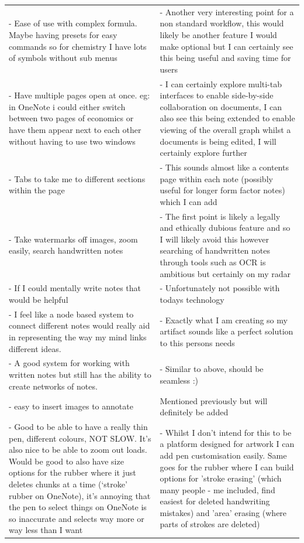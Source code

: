 \begin{longtable}{@{}p{}@{\hspace{1em}}p{}@{}}
 - Ease of use with complex formula. Maybe having presets for easy commands so for chemistry I have lots of symbols without sub menus &
 - Another very interesting point for a non standard workflow, this would likely be another feature I would make optional but I can certainly see this being useful and saving time for users \\

 - Have multiple pages open at once. eg: in OneNote i could either switch between two pages of economics or have them appear next to each other without having to use two windows &
 - I can certainly explore multi-tab interfaces to enable side-by-side collaboration on documents, I can also see this being extended to enable viewing of the overall graph whilst a documents is being edited, I will certainly explore further \\

 - Tabs to take me to different sections within the page &
 - This sounds almost like a contents page within each note (possibly useful for longer form factor notes) which I can add \\

 - Take watermarks off images, zoom easily, search handwritten notes &
 - The first point is likely a legally and ethically dubious feature and so I will likely avoid this however searching of handwritten notes through tools such as OCR is ambitious but certainly on my radar \\

 - If I could mentally write notes that would be helpful &
 - Unfortunately not possible with todays technology \\

 - I feel like a node based system to connect different notes would really aid in representing the way my mind links different ideas. &
 - Exactly what I am creating so my artifact sounds like a perfect solution to this persons needs \\

 - A good system for working with written notes but still has the ability to create networks of notes. &
 - Similar to above, should be seamless :) \\

 - easy to insert images to annotate &
 Mentioned previously but will definitely be added \\

 - Good to be able to have a really thin pen, different colours, NOT SLOW. It's also nice to be able to zoom out loads. Would be good to also have size options for the rubber where it just deletes chunks at a time (‘stroke' rubber on OneNote), it's annoying that the pen to select things on OneNote is so inaccurate and selects way more or way less than I want &
 - Whilst I don't intend for this to be a platform designed for artwork I can add pen customisation easily. Same goes for the rubber where I can build options for 'stroke erasing' (which many people - me included, find easiest for deleted handwriting mistakes) and 'area' erasing (where parts of strokes are deleted) \\


\end{longtable}

